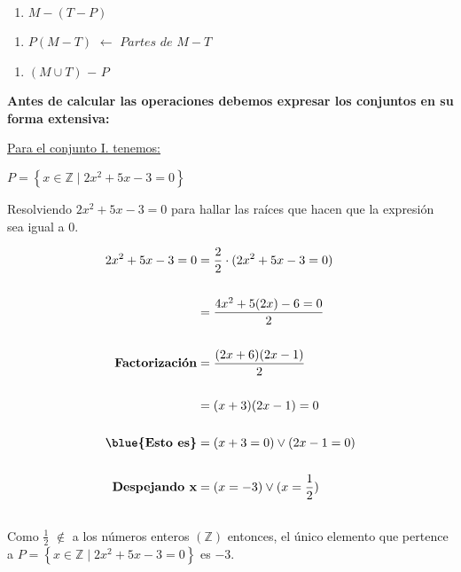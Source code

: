 \documentclass[12pt]{article}
\begin{document}
{{}}

\begin{enumerate}
        \item [\blue{a)}] $M-(T-P)$
\end{enumerate}
\begin{enumerate}
        \item [\blue{b)}] $P(M-T)$ $\leftarrow$ $Partes$ $de$  $M-T$
\end{enumerate}
\begin{enumerate}
        \item [\blue{c)}] $(M \cup T)$ $-$ $P$\\
\end{enumerate}
{\textbf{Antes de calcular las operaciones debemos expresar los conjuntos en su forma extensiva:\\}}

\underline{Para el conjunto I. tenemos:}

\begin{center}
     $P= \left\{x \in \mathbb{Z} \mid 2x^2+5x-3=0\right\}$
\end{center}

Resolviendo $2x^2+5x-3=0$ para hallar las raíces que hacen que la expresión sea igual a $0$.

\begin{equation}
    \begin{split}
        2x^2+5x-3=0 & =  \frac{2}{2}\cdot(2x^2+5x-3=0) \\\\
         & =  \frac{4x^2+5(2x)-6=0}{2}\\\\ \textbf{Factorización}
        & = \frac{(2x+6)(2x-1)}{2}\\\\
         & = (x+3)(2x-1)=0\\\\ \textbf{\blue{Esto es}}
          & = (x+3=0) \vee (2x-1=0)\\\\ \textbf{Despejando x}
          & = (x=-3) \vee (x=\frac{1}{2})\\\\
    \end{split}
\end{equation}
Como $\frac{1}{2}$ $\notin$ a los números enteros $(\mathbb{Z})$ entonces, el único elemento que pertence a $P= \left\{x \in \mathbb{Z} \mid 2x^2+5x-3=0\right\}$ es $-3$.\\
\end{document}

